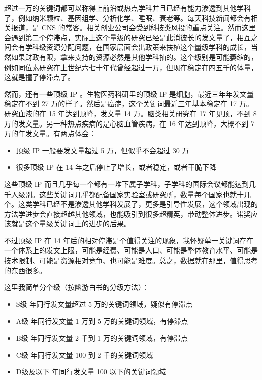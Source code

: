 \documentclass[]{tufte-book}
\providecommand{\tightlist}{%
  \setlength{\itemsep}{0pt}\setlength{\parskip}{0pt}}
\begin{document}
超过一万的关键词都可以称得上前沿或热点学科并且已经有能力渗透到其他学科了，例如纳米颗粒、基因组学、分析化学、睡眠、衰老等。每天科技新闻都会有相关报道，是 CNS 的常客。相关创业公司会受到科技类风投的重点关注。然而这里会遇到第二个停滞点，实际上这个量级的研究已经是此消彼长的发文量了，相互之间会有学科级资源分配问题，在国家层面会出政策来扶植这个量级学科的成长，当然如果财政有限，拿来支持的资源必然是其他学科抽的。这个级别是可能萎缩的，例如同位素研究在上世纪六七十年代曾经超过一万，但现在稳定在四五千的体量，这就是撞了停滞点了。

然而，还有一些顶级 IP 。生物医药科研里的顶级 IP 是细胞，最近三年年发文量稳定在不到 27 万的样子。然后是癌症，这个关键词最近三年基本稳定在 17 万。研究血液的在 15 年达到顶峰，发文量 14 万。脑类相关研究在 17 年见顶，不到 8 万的发文量。另一种热点疾病的是心脑血管疾病，在 16 年达到顶峰，大概不到 7 万的年发文量。有两点体会：

\begin{itemize}
\tightlist
\item
  顶级 IP 一般要发文量超过 5 万，但似乎不会超过 30 万
\item
  很多顶级 IP 在 14 年之后停止了增长，或者稳定，或者干脆下降
\end{itemize}

这些顶级 IP 而且几乎每一个都有一堆下属子学科，子学科的国际会议都能达到几千人级别。这些关键词几乎都配备国家实验室或研究所，数量每个国家也就十几个。这类学科已经不是渗透其他学科发展了，更多是引导性发展，这个领域出现的方法学进步会直接超越其他领域，也能吸引到很多超精英，带动整体进步。诺奖应该就是这个量级关键词上的进步的后果。

不过顶级 IP 在 14 年后的相对停滞是个值得关注的现象，我怀疑单一关键词存在一个体系上的发文上限，可能是经费、可能是人口、可能是整体教育水平、可能是技术限制、可能是资源相对竞争、也可能是难度。总之，数据就在那里，值得思考的东西很多。

这里我简单分个级（按幽游白书的分级方法）：

\begin{itemize}
\tightlist
\item
  S级 年同行发文量超过 5 万的关键词领域，疑似有停滞点
\item
  A级 年同行发文量 1 万到 5 万的关键词领域，有停滞点
\item
  B级 年同行发文量 2 千到 1 万的关键词领域，有停滞点
\item
  C级 年同行发文量 100 到 2 千的关键词领域
\item
  D级及以下 年同行发文量 100 以下的关键词领域
\end{itemize}
\end{document}
